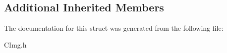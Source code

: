 \subsection*{Additional Inherited Members}


The documentation for this struct was generated from the following file\-:\begin{DoxyCompactItemize}
\item 
C\-Img.\-h\end{DoxyCompactItemize}
